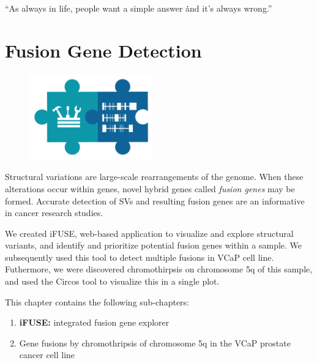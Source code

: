 \begin{savequote}[75mm]
“As always in life, people want a simple answer \. \. \. and it’s always wrong.”
\end{savequote}

\chapter{Fusion Gene Detection}\label{chapter:fusiongenes}
\setcounter{figure}{-1}
\setcounter{table}{-1}
\setcounter{section}{-1}

\begin{figure}[t!]
\includegraphics[height=10em]{frontmatter/images/chapter-header-fusion-tools.png}
\end{figure}
\setcounter{figure}{-1}
\setcounter{table}{-1}
\setcounter{section}{-1}


Structural variations are large-scale rearrangements of the genome. When these alterations occur within genes, novel hybrid genes called \emph{fusion genes} may be formed. Accurate detection of SVs and resulting fusion genes are an informative in cancer research studies.

We created iFUSE, web-based application to visualize and explore structural variants, and identify and prioritize potential fusion genes within a sample. We subsequently used this tool to detect multiple fusions in VCaP cell line. Futhermore, we were discovered chromothirpsis on chromosome 5q of this sample, and used the Circos tool to visualize this in a single plot.

This chapter contains the following sub-chapters:

\begin{enumerate}[label=\ref{chapter:fusiongenes}.\arabic*]
\itemsep-0.5em
\setcounter{enumi}{-1}
\item \textbf{iFUSE:} integrated fusion gene explorer
\item Gene fusions by chromothripsis of chromosome 5q in the VCaP prostate cancer cell line
\end{enumerate}
